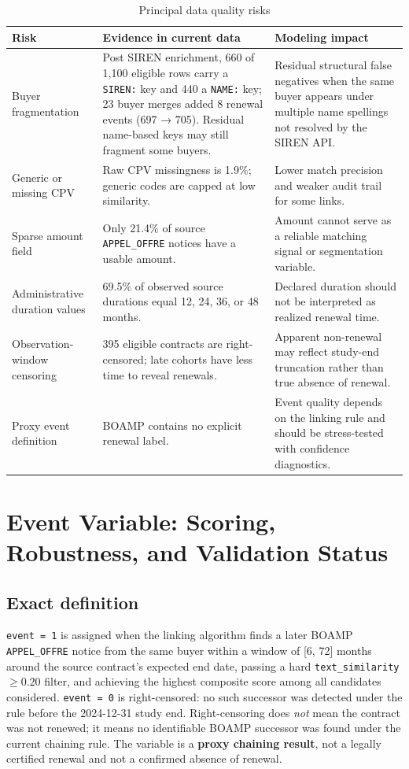 \documentclass[11pt,a4paper]{article}
\begin{document}
\begin{table}[H]
\centering
\caption{Principal data quality risks}
\small
\begin{tabularx}{\linewidth}{L{3.2cm}Y Y}
\toprule
Risk & Evidence in current data & Modeling impact \\
\midrule
Buyer fragmentation & Post SIREN enrichment, 660 of 1{,}100 eligible rows carry a \texttt{SIREN:} key and 440 a \texttt{NAME:} key; 23 buyer merges added 8 renewal events (697 → 705). Residual name-based keys may still fragment some buyers. & Residual structural false negatives when the same buyer appears under multiple name spellings not resolved by the SIREN API. \\
Generic or missing CPV & Raw CPV missingness is 1.9\%; generic codes are capped at low similarity. & Lower match precision and weaker audit trail for some links. \\
Sparse amount field & Only 21.4\% of source \texttt{APPEL\_OFFRE} notices have a usable amount. & Amount cannot serve as a reliable matching signal or segmentation variable. \\
Administrative duration values & 69.5\% of observed source durations equal 12, 24, 36, or 48 months. & Declared duration should not be interpreted as realized renewal time. \\
Observation-window censoring & 395 eligible contracts are right-censored; late cohorts have less time to reveal renewals. & Apparent non-renewal may reflect study-end truncation rather than true absence of renewal. \\
Proxy event definition & BOAMP contains no explicit renewal label. & Event quality depends on the linking rule and should be stress-tested with confidence diagnostics. \\
\bottomrule
\end{tabularx}
\end{table}

\section{Event Variable: Scoring, Robustness, and Validation Status}

\subsection*{Exact definition}

\texttt{event = 1} is assigned when the linking algorithm finds a later BOAMP
\texttt{APPEL\_OFFRE} notice from the same buyer within a window of [6, 72]
months around the source contract's expected end date, passing a hard
\texttt{text\_similarity} $\geq 0.20$ filter, and achieving the highest
composite score among all candidates considered.
\texttt{event = 0} is right-censored: no such successor was detected under the
rule before the 2024-12-31 study end. Right-censoring does \emph{not} mean the
contract was not renewed; it means no identifiable BOAMP successor was found
under the current chaining rule. The variable is a \textbf{proxy chaining
result}, not a legally certified renewal and not a confirmed absence of renewal.
\end{document}

